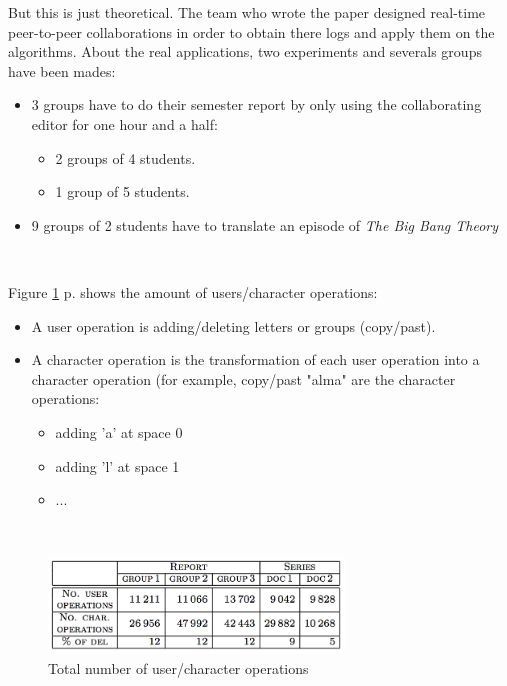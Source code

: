 But this is just theoretical. The team who wrote the paper designed real-time peer-to-peer collaborations in order to obtain there logs and apply them on the algorithms. About the real applications, two experiments and severals groups have been mades:
\begin{itemize}
	\item 3 groups have to do their semester report by only using the collaborating editor for one hour and a half:
		\begin{itemize}
			\item 2 groups of 4 students.
			\item 1 group of 5 students.
		\end{itemize}
	\item 9 groups of 2 students have to translate an episode of \emph{The Big Bang Theory}
\end{itemize}~

Figure \ref{fig:operations} p.\pageref{fig:operations} shows the amount of users/character operations:
\begin{itemize}
	\item A user operation is adding/deleting letters or groups (copy/past).
	\item A character operation is the transformation of each user operation into a character operation (for example, copy/past "alma" are the character operations: \begin{itemize}
					\item adding 'a' at space 0
					\item adding 'l' at space 1
					\item ...
				\end{itemize}
\end{itemize}~

\begin{figure}[h]
  \center
  \includegraphics[width=0.7\textwidth]{includes/operations.png}
  \caption{Total number of user/character operations}
  \label{fig:operations}
\end{figure}